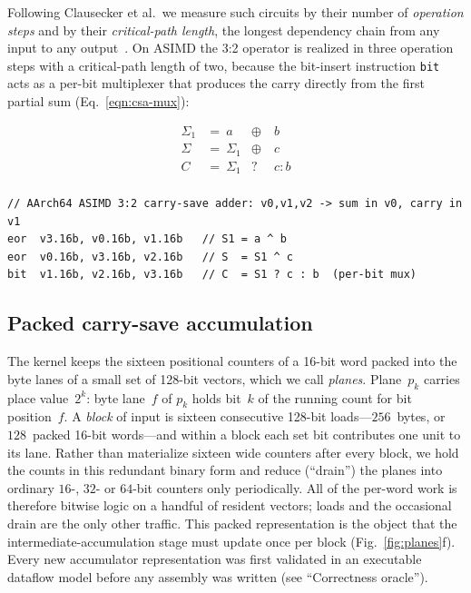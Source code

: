 \documentclass[fleqn,10pt]{wlscirep}
\begin{document}
Following Clausecker et al.\ we measure such circuits by their number of \emph{operation steps} and by their \emph{critical-path length}, the longest dependency chain from any input to any output~\cite{clausecker2024}. On ASIMD the 3:2 operator is realized in three operation steps with a critical-path length of two, because the bit-insert instruction \texttt{bit} acts as a per-bit multiplexer that produces the carry directly from the first partial sum (Eq.~\ref{eqn:csa-mux}):

\noindent
\begin{minipage}{.26\textwidth}
\begin{equation}\label{eqn:csa-mux}
\begin{alignedat}{3}
\Sigma_1&=~a &\oplus &~b\\[-1mm]
\Sigma&=~\Sigma_1 &\oplus &~c\\[-1mm]
C&=~\Sigma_1 &\mathbin? &~c\mathbin:b\\
\end{alignedat}
\end{equation}
\end{minipage}
\hfill
\begin{minipage}{.70\textwidth}\vspace*{4pt}
\begin{lstlisting}[style=customc,language={[Motorola68k]Assembler},morecomment={[l]{//}},morekeywords={eor,eor3,bit}]
// AArch64 ASIMD 3:2 carry-save adder: v0,v1,v2 -> sum in v0, carry in v1
eor  v3.16b, v0.16b, v1.16b   // S1 = a ^ b
eor  v0.16b, v3.16b, v2.16b   // S  = S1 ^ c
bit  v1.16b, v2.16b, v3.16b   // C  = S1 ? c : b  (per-bit mux)
\end{lstlisting}
\end{minipage}

\subsection*{Packed carry-save accumulation}
The kernel keeps the sixteen positional counters of a 16-bit word packed into the byte lanes of a small set of 128-bit vectors, which we call \emph{planes}. Plane~$p_k$ carries place value~$2^k$: byte lane~$f$ of $p_k$ holds bit~$k$ of the running count for bit position~$f$. A \emph{block} of input is sixteen consecutive 128-bit loads---$256$~bytes, or $128$~packed 16-bit words---and within a block each set bit contributes one unit to its lane. Rather than materialize sixteen wide counters after every block, we hold the counts in this redundant binary form and reduce (``drain'') the planes into ordinary $16$-, $32$- or $64$-bit counters only periodically. All of the per-word work is therefore bitwise logic on a handful of resident vectors; loads and the occasional drain are the only other traffic. This packed representation is the object that the intermediate-accumulation stage must update once per block (Fig.~\ref{fig:planes}f). Every new accumulator representation was first validated in an executable dataflow model before any assembly was written (see ``Correctness oracle'').
\end{document}

